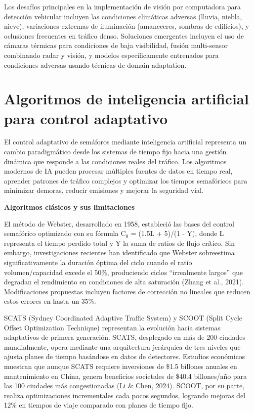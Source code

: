 \documentclass[12pt,a4paper,oneside]{report}
\begin{document}
Los desafíos principales en la implementación de visión por computadora para detección vehicular incluyen las condiciones climáticas adversas (lluvia, niebla, nieve), variaciones extremas de iluminación (amaneceres, sombras de edificios), y oclusiones frecuentes en tráfico denso. Soluciones emergentes incluyen el uso de cámaras térmicas para condiciones de baja visibilidad, fusión multi-sensor combinando radar y visión, y modelos específicamente entrenados para condiciones adversas usando técnicas de domain adaptation.

\section{Algoritmos de inteligencia artificial para control adaptativo}\label{algoritmos-de-inteligencia-artificial-para-control-adaptativo}

El control adaptativo de semáforos mediante inteligencia artificial representa un cambio paradigmático desde los sistemas de tiempo fijo hacia una gestión dinámica que responde a las condiciones reales del tráfico. Los algoritmos modernos de IA pueden procesar múltiples fuentes de datos en tiempo real, aprender patrones de tráfico complejos y optimizar los tiempos semafóricos para minimizar demoras, reducir emisiones y mejorar la seguridad vial.

\textbf{Algoritmos clásicos y sus limitaciones}

El método de Webster, desarrollado en 1958, estableció las bases del control semafórico optimizado con su fórmula C\ensuremath{_{0}} = (1.5L + 5)/(1 - Y), donde L representa el tiempo perdido total y Y la suma de ratios de flujo crítico. Sin embargo, investigaciones recientes han identificado que Webster sobreestima significativamente la duración óptima del ciclo cuando el ratio volumen/capacidad excede el 50\%, produciendo ciclos ``irrealmente largos'' que degradan el rendimiento en condiciones de alta saturación (Zhang et al., 2021). Modificaciones propuestas incluyen factores de corrección no lineales que reducen estos errores en hasta un 35\%.

SCATS (Sydney Coordinated Adaptive Traffic System) y SCOOT (Split Cycle Offset Optimization Technique) representan la evolución hacia sistemas adaptativos de primera generación. SCATS, desplegado en más de 200 ciudades mundialmente, opera mediante una arquitectura jerárquica de tres niveles que ajusta planes de tiempo basándose en datos de detectores. Estudios económicos muestran que aunque SCATS requiere inversiones de \$1.5 billones anuales en mantenimiento en China, genera beneficios societales de \$40.4 billones/año para las 100 ciudades más congestionadas (Li \& Chen, 2024). SCOOT, por su parte, realiza optimizaciones incrementales cada pocos segundos, logrando mejoras del 12\% en tiempos de viaje comparado con planes de tiempo fijo.
\end{document}
